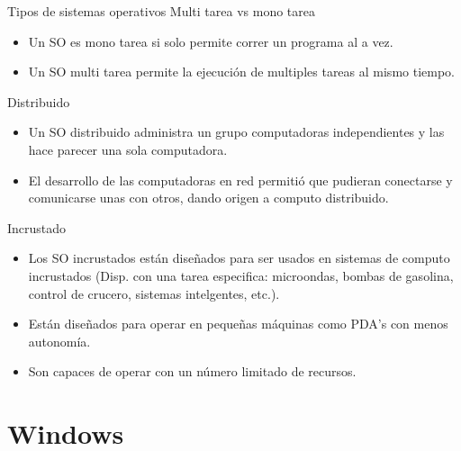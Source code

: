 \documentclass[11pt]{beamer}
\begin{document}
		\begin{frame}{Tipos de sistemas operativos}
			Multi tarea vs mono tarea
			\begin{itemize}
				\scriptsize
				\item Un SO es mono tarea si solo permite correr un programa al a vez.
				\item Un SO multi tarea permite la ejecución de multiples tareas al mismo tiempo.
			\end{itemize}
			Distribuido
			\begin{itemize}
				\scriptsize
				\item Un SO distribuido administra un grupo computadoras independientes y las hace parecer una sola computadora.
				\item El desarrollo de las computadoras en red permitió que pudieran conectarse y comunicarse unas con otros, dando origen a computo distribuido.
			\end{itemize}
			Incrustado
			\begin{itemize}
				\scriptsize
				\item Los SO incrustados están diseñados para ser usados en sistemas de computo incrustados (Disp. con una tarea especifica: microondas, bombas de gasolina, control de crucero, sistemas intelgentes, etc.).
				\item Están diseñados para operar en pequeñas máquinas como PDA's con menos autonomía.
				\item Son capaces de operar con un número limitado de recursos.
			\end{itemize}
		\end{frame}
\section{Windows}
\end{document}
